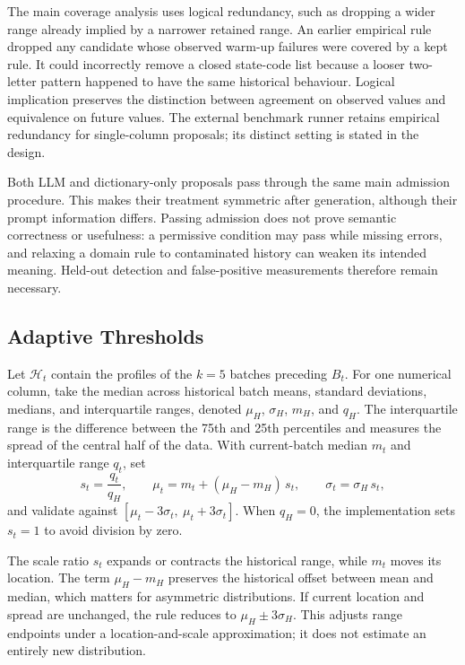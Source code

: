 The main coverage analysis uses logical redundancy, such as dropping a wider range already implied by a narrower retained range. An earlier empirical rule dropped any candidate whose observed warm-up failures were covered by a kept rule. It could incorrectly remove a closed state-code list because a looser two-letter pattern happened to have the same historical behaviour. Logical implication preserves the distinction between agreement on observed values and equivalence on future values. The external benchmark runner retains empirical redundancy for single-column proposals; its distinct setting is stated in the design.

Both LLM and dictionary-only proposals pass through the same main admission procedure. This makes their treatment symmetric after generation, although their prompt information differs. Passing admission does not prove semantic correctness or usefulness: a permissive condition may pass while missing errors, and relaxing a domain rule to contaminated history can weaken its intended meaning. Held-out detection and false-positive measurements therefore remain necessary.

\subsection{Adaptive Thresholds}
\label{sec:method:adapt}

Let $\mathcal{H}_t$ contain the profiles of the $k=5$ batches preceding $B_t$. For one numerical column, take the median across historical batch means, standard deviations, medians, and interquartile ranges, denoted $\mu_H$, $\sigma_H$, $m_H$, and $q_H$. The interquartile range is the difference between the 75th and 25th percentiles and measures the spread of the central half of the data. With current-batch median $m_t$ and interquartile range $q_t$, set
\begin{equation}
s_t = \frac{q_t}{q_H}, \qquad
\mu_t = m_t + (\mu_H-m_H)\,s_t, \qquad
\sigma_t = \sigma_H\,s_t,
\label{eq:adapt}
\end{equation}
and validate against $[\mu_t-3\sigma_t,\ \mu_t+3\sigma_t]$. When $q_H=0$, the implementation sets $s_t=1$ to avoid division by zero.

The scale ratio $s_t$ expands or contracts the historical range, while $m_t$ moves its location. The term $\mu_H-m_H$ preserves the historical offset between mean and median, which matters for asymmetric distributions. If current location and spread are unchanged, the rule reduces to $\mu_H\pm3\sigma_H$. This adjusts range endpoints under a location-and-scale approximation; it does not estimate an entirely new distribution.

